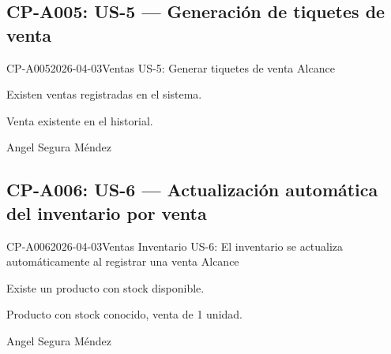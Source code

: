 \subsection{CP-A005: US-5 --- Generación de tiquetes de venta}
\def\cpPasos{%
  \item Navegar a Ventas \arr{} historial de ventas.
  \item Seleccionar una venta.
  \item Usar opción ``Imprimir factura'' o ``Descargar''.}
\def\cpResultadoE{%
  \item Se genera el comprobante de venta correctamente.}
\def\cpResultadoO{El historial de ventas muestra opciones ``Imprimir factura'' y
  ``Descargar''. El comprobante se generó correctamente con los datos de la venta.}
\casoprueba
  {CP-A005}{2026-04-03}{Ventas}
  {US-5: Generar tiquetes de venta}
  {Alcance}{\estadoAprobado}
  {\item Existen ventas registradas en el sistema.}
  {\item Venta existente en el historial.}
  {Angel Segura Méndez}

\subsection{CP-A006: US-6 --- Actualización automática del inventario por venta}
\def\cpPasos{%
  \item Anotar stock actual de un producto en Inventario.
  \item Crear y confirmar una venta de 1 unidad de ese producto.
  \item Verificar el stock en Inventario.}
\def\cpResultadoE{%
  \item El stock se reduce automáticamente sin intervención manual.}
\def\cpResultadoO{El stock se redujo automáticamente al confirmar la venta.
  No se requirió ninguna acción manual adicional.}
\casoprueba
  {CP-A006}{2026-04-03}{Ventas \arr{} Inventario}
  {US-6: El inventario se actualiza automáticamente al registrar una venta}
  {Alcance}{\estadoAprobado}
  {\item Existe un producto con stock disponible.}
  {\item Producto con stock conocido, venta de 1 unidad.}
  {Angel Segura Méndez}

